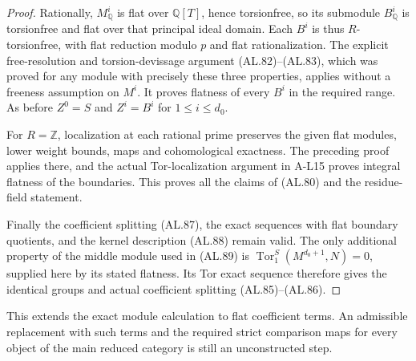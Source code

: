 \begin{proof}
Rationally, $M^i_{\mathbb Q}$ is flat over
$\mathbb Q[T]$, hence torsionfree, so its submodule
$B^i_{\mathbb Q}$ is torsionfree and flat over that
principal ideal domain. Each $B^i$ is thus
$R$-torsionfree, with flat reduction modulo $p$ and
flat rationalization. The explicit free-resolution
and torsion-devissage argument (AL.82)--(AL.83),
which was proved for any module with precisely
these three properties, applies without a freeness
assumption on $M^i$. It proves flatness of every
$B^i$ in the required range. As before $Z^0=S$ and
$Z^i=B^i$ for $1\leq i\leq d_0$.

For $R=\mathbb Z$, localization at each rational
prime preserves the given flat modules, lower
weight bounds, maps and cohomological exactness.
The preceding proof applies there, and the actual
Tor-localization argument in A-L15 proves integral
flatness of the boundaries. This proves all the
claims of (AL.80) and the residue-field statement.

Finally the coefficient splitting (AL.87), the exact
sequences with flat boundary quotients, and the
kernel description (AL.88) remain valid. The only
additional property of the middle module used in
(AL.89) is
$\operatorname{Tor}^S_1(M^{d_0+1},N)=0$, supplied
here by its stated flatness. Its Tor exact sequence
therefore gives the identical groups and actual
coefficient splitting (AL.85)--(AL.86).
\end{proof}

This extends the exact module calculation to flat
coefficient terms. An admissible replacement with
such terms and the required strict comparison maps
for every object of the main reduced category is
still an unconstructed step.
